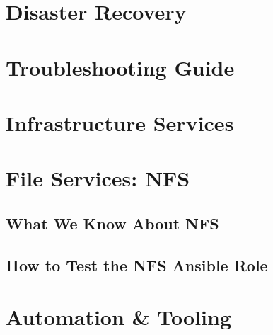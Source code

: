 \chapter{Disaster Recovery}

% 


\chapter{Troubleshooting Guide}

% 


\backmatter

\chapter{Infrastructure Services}



\chapter{File Services: NFS}
\section{What We Know About NFS}


\section{How to Test the NFS Ansible Role}


\chapter{Automation \& Tooling}





